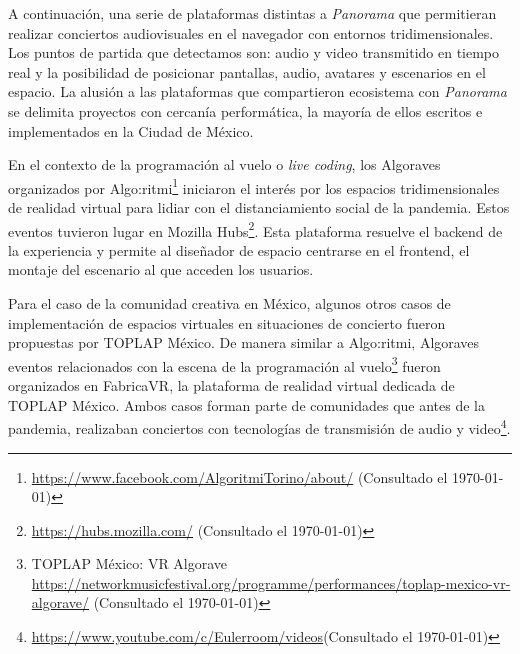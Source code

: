 



A continuación, una serie de plataformas distintas a \textit{Panorama} que permitieran realizar conciertos audiovisuales en el navegador con entornos tridimensionales. Los puntos de partida que detectamos son: audio y video transmitido en tiempo real y la posibilidad de posicionar pantallas, audio, avatares y escenarios en el espacio. La alusión a las plataformas que compartieron ecosistema con \textit{Panorama} se delimita proyectos con cercanía performática, la mayoría de ellos escritos e implementados en la Ciudad de México. 

En el contexto de la programación al vuelo o \textit{live coding}, los Algoraves organizados por Algo:ritmi\footnote{\url{https://www.facebook.com/AlgoritmiTorino/about/} (Consultado el \today)} iniciaron el interés por los espacios tridimensionales de realidad virtual para lidiar con el distanciamiento social de la pandemia. Estos eventos tuvieron lugar en Mozilla Hubs\footnote{\url{https://hubs.mozilla.com/} (Consultado el \today)}. Esta plataforma resuelve el backend de la experiencia y permite al diseñador de espacio centrarse en el frontend, el montaje del escenario al que acceden los usuarios.


Para el caso de la comunidad creativa en México, algunos otros casos de implementación de espacios virtuales en situaciones de concierto fueron propuestas por TOPLAP México. De manera similar a Algo:ritmi, Algoraves eventos relacionados con la escena de la programación al vuelo\footnote{TOPLAP México: VR Algorave \url{https://networkmusicfestival.org/programme/performances/toplap-mexico-vr-algorave/} (Consultado el \today)} fueron organizados en FabricaVR, la plataforma de realidad virtual dedicada de TOPLAP México. Ambos casos forman parte de comunidades que antes de la pandemia, realizaban conciertos con tecnologías de transmisión de audio y video\footnote{\url{https://www.youtube.com/c/Eulerroom/videos}(Consultado el \today)}.%

